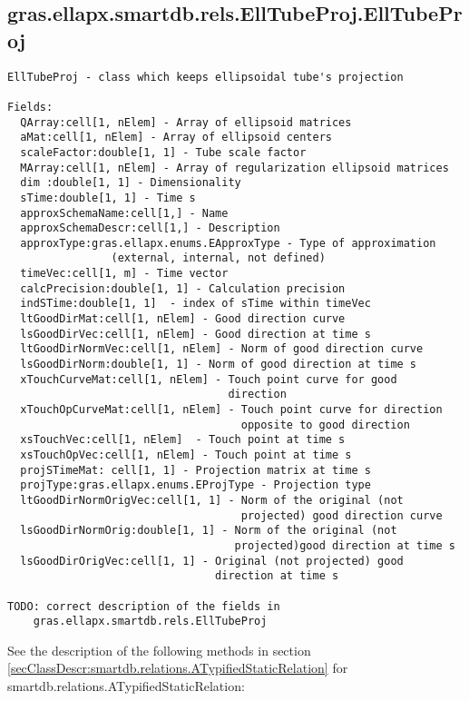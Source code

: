 \subsection{\texorpdfstring{gras.ellapx.smartdb.rels.EllTubeProj.EllTubeProj}{EllTubeProj}}\label{method:gras.ellapx.smartdb.rels.EllTubeProj.EllTubeProj}
\begin{verbatim}
EllTubeProj - class which keeps ellipsoidal tube's projection

Fields:
  QArray:cell[1, nElem] - Array of ellipsoid matrices
  aMat:cell[1, nElem] - Array of ellipsoid centers
  scaleFactor:double[1, 1] - Tube scale factor
  MArray:cell[1, nElem] - Array of regularization ellipsoid matrices
  dim :double[1, 1] - Dimensionality
  sTime:double[1, 1] - Time s
  approxSchemaName:cell[1,] - Name
  approxSchemaDescr:cell[1,] - Description
  approxType:gras.ellapx.enums.EApproxType - Type of approximation
                (external, internal, not defined)
  timeVec:cell[1, m] - Time vector
  calcPrecision:double[1, 1] - Calculation precision
  indSTime:double[1, 1]  - index of sTime within timeVec
  ltGoodDirMat:cell[1, nElem] - Good direction curve
  lsGoodDirVec:cell[1, nElem] - Good direction at time s
  ltGoodDirNormVec:cell[1, nElem] - Norm of good direction curve
  lsGoodDirNorm:double[1, 1] - Norm of good direction at time s
  xTouchCurveMat:cell[1, nElem] - Touch point curve for good
                                  direction
  xTouchOpCurveMat:cell[1, nElem] - Touch point curve for direction
                                    opposite to good direction
  xsTouchVec:cell[1, nElem]  - Touch point at time s
  xsTouchOpVec:cell[1, nElem] - Touch point at time s
  projSTimeMat: cell[1, 1] - Projection matrix at time s
  projType:gras.ellapx.enums.EProjType - Projection type
  ltGoodDirNormOrigVec:cell[1, 1] - Norm of the original (not
                                    projected) good direction curve
  lsGoodDirNormOrig:double[1, 1] - Norm of the original (not
                                   projected)good direction at time s
  lsGoodDirOrigVec:cell[1, 1] - Original (not projected) good
                                direction at time s

TODO: correct description of the fields in
    gras.ellapx.smartdb.rels.EllTubeProj
\end{verbatim}


See the description of the following methods in section \ref{secClassDescr:smartdb.relations.ATypifiedStaticRelation}
 for smartdb.relations.ATypifiedStaticRelation:


